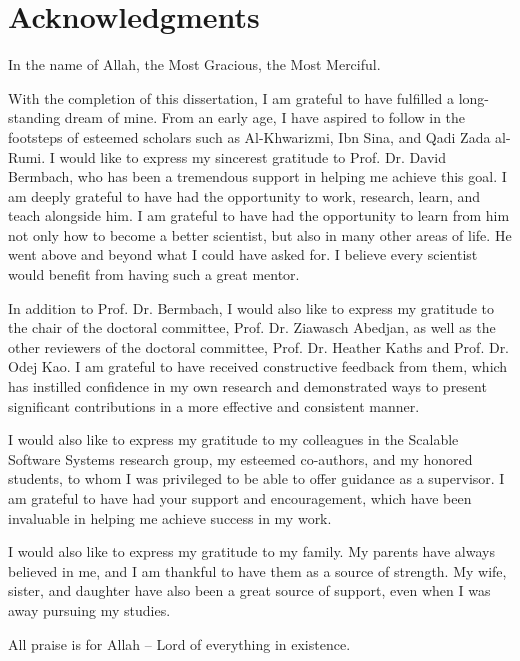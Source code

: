 
\cleardoublepage
{}
\section*{Acknowledgments}
In the name of Allah, the Most Gracious, the Most Merciful.

With the completion of this dissertation, I am grateful to have fulfilled a long-standing dream of mine.
From an early age, I have aspired to follow in the footsteps of esteemed scholars such as Al-Khwarizmi, Ibn Sina, and Qadi Zada al-Rumi.
I would like to express my sincerest gratitude to Prof. Dr. David Bermbach, who has been a tremendous support in helping me achieve this goal.
I am deeply grateful to have had the opportunity to work, research, learn, and teach alongside him.
I am grateful to have had the opportunity to learn from him not only how to become a better scientist, but also in many other areas of life.
He went above and beyond what I could have asked for.
I believe every scientist would benefit from having such a great mentor.

In addition to Prof. Dr. Bermbach, I would also like to express my gratitude to the chair of the doctoral committee, Prof. Dr. Ziawasch Abedjan, as well as the other reviewers of the doctoral committee, Prof. Dr. Heather Kaths and Prof. Dr. Odej Kao.
I am grateful to have received constructive feedback from them, which has instilled confidence in my own research and demonstrated ways to present significant contributions in a more effective and consistent manner.

I would also like to express my gratitude to my colleagues in the Scalable Software Systems research group, my esteemed co-authors, and my honored students, to whom I was privileged to be able to offer guidance as a supervisor.
I am grateful to have had your support and encouragement, which have been invaluable in helping me achieve success in my work.

I would also like to express my gratitude to my family. My parents have always believed in me, and I am thankful to have them as a source of strength.
My wife, sister, and daughter have also been a great source of support, even when I was away pursuing my studies.


All praise is for Allah -- Lord of everything in existence.  

\afterpage{\null\thispagestyle{empty}\newpage}
